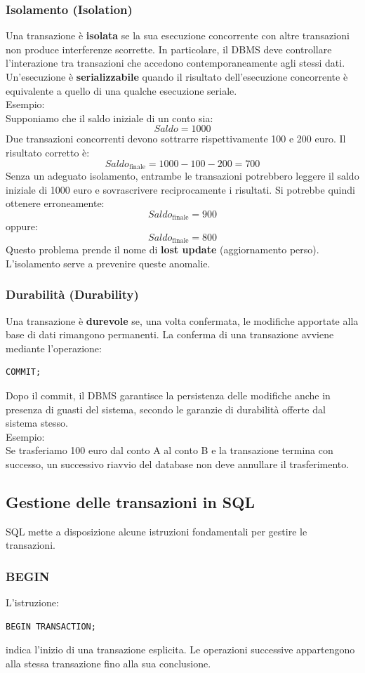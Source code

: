 \subsubsection{Isolamento (Isolation)}
Una transazione è \textbf{isolata} se la sua esecuzione
concorrente con altre transazioni non produce
interferenze scorrette.
In particolare, il DBMS deve controllare
l'interazione tra transazioni che accedono
contemporaneamente agli stessi dati.
Un'esecuzione è \textbf{serializzabile} quando il risultato
dell'esecuzione concorrente è equivalente a quello
di una qualche esecuzione seriale.\\
\textcolor{verdeEsempio}{Esempio:}\\
Supponiamo che il saldo iniziale di un conto sia:
\[
Saldo = 1000
\]
Due transazioni concorrenti devono sottrarre
rispettivamente 100 e 200 euro.
Il risultato corretto è:
\[
Saldo_{\text{finale}} = 1000 - 100 - 200 = 700
\]
Senza un adeguato isolamento, entrambe le transazioni
potrebbero leggere il saldo iniziale di 1000 euro
e sovrascrivere reciprocamente i risultati.
Si potrebbe quindi ottenere erroneamente:
\[
Saldo_{\text{finale}} = 900
\]
oppure:
\[
Saldo_{\text{finale}} = 800
\]
Questo problema prende il nome di
\textbf{lost update} (aggiornamento perso).
L'isolamento serve a prevenire queste anomalie.
\subsubsection{Durabilità (Durability)}
Una transazione è \textbf{durevole} se, una volta
confermata, le modifiche apportate alla base di dati
rimangono permanenti.
La conferma di una transazione avviene mediante
l'operazione:
\begin{verbatim}
COMMIT;
\end{verbatim}
Dopo il commit, il DBMS garantisce la persistenza
delle modifiche anche in presenza di guasti
del sistema, secondo le garanzie di durabilità
offerte dal sistema stesso.\\
\textcolor{verdeEsempio}{Esempio:}\\
Se trasferiamo 100 euro dal conto A al conto B
e la transazione termina con successo, un successivo
riavvio del database non deve annullare il trasferimento.
\subsection{Gestione delle transazioni in SQL}
SQL mette a disposizione alcune istruzioni fondamentali
per gestire le transazioni.
\subsubsection{BEGIN}
L'istruzione:
\begin{verbatim}
BEGIN TRANSACTION;
\end{verbatim}
indica l'inizio di una transazione esplicita.
Le operazioni successive appartengono alla stessa
transazione fino alla sua conclusione.

